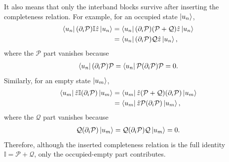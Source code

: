 \documentclass[10pt, oneside]{article}
\begin{document}
It also means that only the interband blocks survive after inserting the completeness relation.
For example, for an occupied state \(\ket{u_n}\),
\begin{align}
    \begin{split}
    \bra{u_n}(\partial_i\mathcal P)\mathbb I\hat z\ket{u_n}
    &=
    \bra{u_n}(\partial_i\mathcal P)(\mathcal P+\mathcal Q)\hat z\ket{u_n} \\
    &=
    \bra{u_n}(\partial_i\mathcal P)\mathcal Q\hat z\ket{u_n},
    \end{split}
\end{align}
where the \(\mathcal P\) part vanishes because
\begin{align}
    \bra{u_n}(\partial_i\mathcal P)\mathcal P  = \bra{u_n}\mathcal P(\partial_i\mathcal P)\mathcal P = 0.
\end{align}
Similarly, for an empty state \(\ket{u_m}\),
\begin{align}
    \begin{split}
    \bra{u_m}\hat z\mathbb I(\partial_i\mathcal P)\ket{u_m}
    &=
    \bra{u_m}\hat z(\mathcal P+\mathcal Q)(\partial_i\mathcal P)\ket{u_m} \\
    &=
    \bra{u_m}\hat z\mathcal P(\partial_i\mathcal P)\ket{u_m},
    \end{split}
\end{align}
where the \(\mathcal Q\) part vanishes because
\begin{align}
    \mathcal Q(\partial_i\mathcal P)\ket{u_m} = \mathcal Q(\partial_i\mathcal P)\mathcal Q\ket{u_m} =
    0.
\end{align}
Therefore, although the inserted completeness relation is the full identity \(\mathbb I=\mathcal P+\mathcal Q\), only the occupied-empty part contributes.
\end{document}
